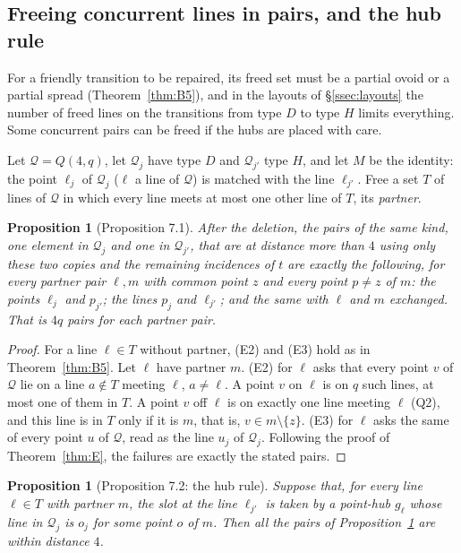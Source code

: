 \documentclass[11pt]{amsart}
\newtheorem{proposition}[theorem]{Proposition}
\theoremstyle{definition}
\theoremstyle{remark}
\newcommand{\cQ}{\mathcal{Q}}
\begin{document}
\subsection{Freeing concurrent lines in pairs, and the hub rule}\label{ssec:relaxed}
For a friendly transition to be repaired, its freed set must be a partial ovoid or a partial spread (Theorem~\ref{thm:B5}), and in the layouts of \S\ref{ssec:layouts} the number of freed lines on the transitions from type $D$ to type $H$ limits everything. Some concurrent pairs can be freed if the hubs are placed with care.

Let $\cQ=Q(4,q)$, let $\cQ_j$ have type $D$ and $\cQ_{j'}$ type $H$, and let $M$ be the identity: the point $\ell_j$ of $\cQ_j$ ($\ell$ a line of $\cQ$) is matched with the line $\ell_{j'}$. Free a set $T$ of lines of $\cQ$ in which every line meets at most one other line of $T$, its \emph{partner}.

\begin{proposition}[Proposition 7.1]\label{prop:badpairs}
After the deletion, the pairs of the same kind, one element in $\cQ_j$ and one in $\cQ_{j'}$, that are at distance more than $4$ using only these two copies and the remaining incidences of $t$ are exactly the following, for every partner pair $\ell,m$ with common point $z$ and every point $p\ne z$ of $m$: the points $\ell_j$ and $p_{j'}$; the lines $p_j$ and $\ell_{j'}$; and the same with $\ell$ and $m$ exchanged. That is $4q$ pairs for each partner pair.
\end{proposition}

\begin{proof}
For a line $\ell\in T$ without partner, (E2) and (E3) hold as in Theorem~\ref{thm:B5}. Let $\ell$ have partner $m$. (E2) for $\ell$ asks that every point $v$ of $\cQ$ lie on a line $a\notin T$ meeting $\ell$, $a\ne\ell$. A point $v$ on $\ell$ is on $q$ such lines, at most one of them in $T$. A point $v$ off $\ell$ is on exactly one line meeting $\ell$ (Q2), and this line is in $T$ only if it is $m$, that is, $v\in m\setminus\{z\}$. (E3) for $\ell$ asks the same of every point $u$ of $\cQ$, read as the line $u_j$ of $\cQ_j$. Following the proof of Theorem~\ref{thm:E}, the failures are exactly the stated pairs.
\end{proof}

\begin{proposition}[Proposition 7.2: the hub rule]\label{prop:hubrule}
Suppose that, for every line $\ell\in T$ with partner $m$, the slot at the line $\ell_{j'}$ is taken by a point-hub $g_\ell$ whose line in $\cQ_j$ is $o_j$ for some point $o$ of $m$. Then all the pairs of Proposition~\ref{prop:badpairs} are within distance $4$.
\end{proposition}
\end{document}
